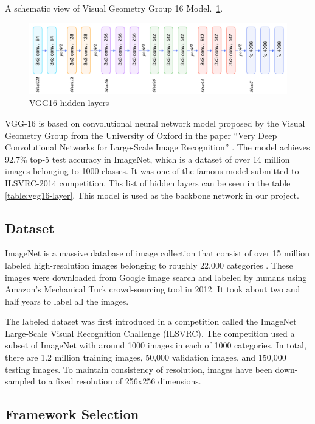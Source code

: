 A schematic view of Visual Geometry Group 16 Model.~\ref{fig:CNN-1}.
\begin{figure}[htbp]
\centering
\includegraphics[width=1\textwidth]{images/cnn-vgg16-1.png}
\caption{VGG16 hidden layers}
\label{fig:CNN-1}
\end{figure}

VGG-16 is based on convolutional neural network model proposed by the Visual Geometry Group from the University of Oxford in the paper “Very Deep Convolutional Networks for Large-Scale Image Recognition” \cite{2014arXiv1409.1556S}. The model achieves 92.7\% top-5 test accuracy in ImageNet, which is a dataset of over 14 million images belonging to 1000 classes. It was one of the famous model submitted to ILSVRC-2014 competition. Ths list of hidden layers can be seen in the table \ref{table:vgg16-layer}. This model is used as the backbone network in our project.

\subsection{Dataset}

ImageNet is a massive database of image collection that consist of over 15 million labeled high-resolution images belonging to roughly 22,000 categories \cite{edsarx.1409.057520140101}. These images were downloaded from Google image search and labeled by humans using Amazon's Mechanical Turk crowd-sourcing tool in 2012. It took about two and half years to label all the images. 

The labeled dataset was first introduced in a competition called the ImageNet Large-Scale Visual Recognition Challenge (ILSVRC). The competition used a subset of ImageNet with around 1000 images in each of 1000 categories. In total, there are 1.2 million training images, 50,000 validation images, and 150,000 testing images. To maintain consistency of resolution, images have been down-sampled to a fixed resolution of 256x256 dimensions.
    
\subsection{Framework Selection}

